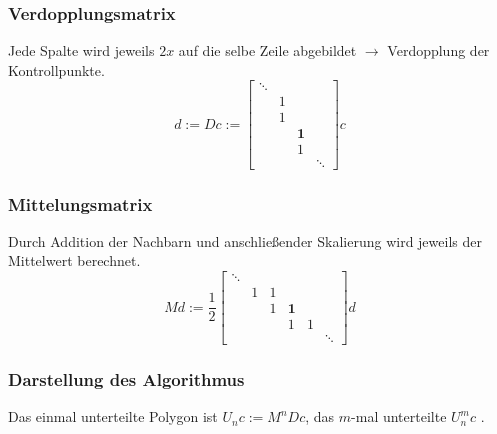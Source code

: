 \subsubsection{Verdopplungsmatrix}
Jede Spalte wird jeweils \(2x\) auf die selbe Zeile abgebildet \(\rightarrow\) Verdopplung der Kontrollpunkte.
\[d := D c :=
	\begin{bmatrix}
		\ddots 	& 		& 				& \\
				& 1 	&				& \\
				& 1 	&				& \\
				&		& \textbf{1} 	& \\
				&		& 1 			& \\
				&		&				& \ddots
	\end{bmatrix}  c
\]

\subsubsection{Mittelungsmatrix}
Durch Addition der Nachbarn und anschließender Skalierung wird jeweils der Mittelwert berechnet.
\[Md := \frac{1}{2}
	\begin{bmatrix}
		\ddots 	& 		& 		&				&		&			\\
				& 1 	& 1		& 				&		&			\\
				& 	 	& 1		& \textbf{1} 	&		&			\\
				&		&		& 1 			& 1		&			\\
				&		&		&				&		& \ddots
	\end{bmatrix} d
\]

\subsubsection{Darstellung des Algorithmus}
Das einmal unterteilte Polygon ist \(U_nc := M^nDc\), das \(m\)-mal unterteilte \(U_n^mc\) .

